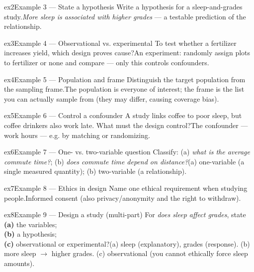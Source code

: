 \documentclass[11pt]{article}
\begin{document}
\begin{example}{ex2}{Example 3 --- State a hypothesis}
Write a hypothesis for a sleep-and-grades study.\soln \emph{More sleep is associated with higher grades} --- a testable prediction of the relationship.
\end{example}

\begin{example}{ex3}{Example 4 --- Observational vs. experimental}
To test whether a fertilizer increases yield, which design proves cause?\soln An experiment: randomly assign plots to fertilizer or none and compare --- only this controls confounders.
\end{example}

\begin{example}{ex4}{Example 5 --- Population and frame}
Distinguish the target population from the sampling frame.\soln The population is everyone of interest; the frame is the list you can actually sample from (they may differ, causing coverage bias).
\end{example}

\begin{example}{ex5}{Example 6 --- Control a confounder}
A study links coffee to poor sleep, but coffee drinkers also work late. What must the design control?\soln The confounder --- work hours --- e.g. by matching or randomizing.
\end{example}

\begin{example}{ex6}{Example 7 --- One- vs. two-variable question}
Classify: (a) \emph{what is the average commute time?}; (b) \emph{does commute time depend on distance?}\soln (a) one-variable (a single measured quantity); (b) two-variable (a relationship).
\end{example}

\begin{example}{ex7}{Example 8 --- Ethics in design}
Name one ethical requirement when studying people.\soln Informed consent (also privacy/anonymity and the right to withdraw).
\end{example}

\begin{example}{ex8}{Example 9 --- Design a study (multi-part)}
For \emph{does sleep affect grades}, state \\ \textbf{(a)} the variables; \\ \textbf{(b)} a hypothesis; \\ \textbf{(c)} observational or experimental?\soln (a) sleep (explanatory), grades (response). (b) more sleep $\to$ higher grades. (c) observational (you cannot ethically force sleep amounts).
\end{example}
\end{document}
